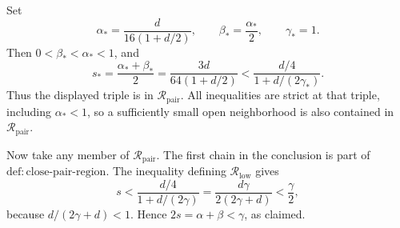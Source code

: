 Set
\[
\alpha_* = \frac{d}{16(1+d/2)},
\qquad
\beta_* = \frac{\alpha_*}{2},
\qquad
\gamma_* = 1.
\]
Then \(0<\beta_*<\alpha_*<1\), and
\[
s_* =\frac{\alpha_*+\beta_*}{2}
=\frac{3d}{64(1+d/2)}
<\frac{d/4}{1+d/(2\gamma_*)}.
\]
Thus the displayed triple is in \(\mathcal R_{\mathrm{pair}}\).  All
inequalities are strict at that triple, including \(\alpha_*<1\), so a
sufficiently small open neighborhood is also contained in
\(\mathcal R_{\mathrm{pair}}\).

Now take any member of \(\mathcal R_{\mathrm{pair}}\).  The first chain in
the conclusion is part of \(\mathrm{def:close\mbox{-}pair\mbox{-}region}\).
The inequality defining \(\mathcal R_{\mathrm{low}}\) gives
\[
s<\frac{d/4}{1+d/(2\gamma)}
=\frac{d\gamma}{2(2\gamma+d)}
<\frac\gamma2,
\]
because \(d/(2\gamma+d)<1\).  Hence
\(2s=\alpha+\beta<\gamma\), as claimed.